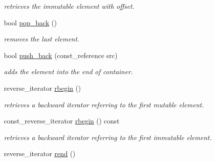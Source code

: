 \begin{DoxyCompactItemize}
\begin{DoxyCompactList}\small\item\em retrieves the immutable element with offset. \end{DoxyCompactList}\item 
\hypertarget{classhryky_1_1_fixed_vector_a67a4b8f465184732e190a2748876e3e8}{bool \hyperlink{classhryky_1_1_fixed_vector_a67a4b8f465184732e190a2748876e3e8}{pop\-\_\-back} ()}\label{classhryky_1_1_fixed_vector_a67a4b8f465184732e190a2748876e3e8}

\begin{DoxyCompactList}\small\item\em removes the last element. \end{DoxyCompactList}\item 
\hypertarget{classhryky_1_1_fixed_vector_abbe51e93d13aaed72485a62ee0163bc8}{bool \hyperlink{classhryky_1_1_fixed_vector_abbe51e93d13aaed72485a62ee0163bc8}{push\-\_\-back} (const\-\_\-reference src)}\label{classhryky_1_1_fixed_vector_abbe51e93d13aaed72485a62ee0163bc8}

\begin{DoxyCompactList}\small\item\em adds the element into the end of container. \end{DoxyCompactList}\item 
\hypertarget{classhryky_1_1_fixed_vector_a87885818e934930c46340007d4be8fff}{reverse\-\_\-iterator \hyperlink{classhryky_1_1_fixed_vector_a87885818e934930c46340007d4be8fff}{rbegin} ()}\label{classhryky_1_1_fixed_vector_a87885818e934930c46340007d4be8fff}

\begin{DoxyCompactList}\small\item\em retrieves a backward iterator referring to the first mutable element. \end{DoxyCompactList}\item 
\hypertarget{classhryky_1_1_fixed_vector_a03626d86b7c7a907ef8bc54042f9e2fb}{const\-\_\-reverse\-\_\-iterator \hyperlink{classhryky_1_1_fixed_vector_a03626d86b7c7a907ef8bc54042f9e2fb}{rbegin} () const }\label{classhryky_1_1_fixed_vector_a03626d86b7c7a907ef8bc54042f9e2fb}

\begin{DoxyCompactList}\small\item\em retrieves a backward iterator referring to the first immutable element. \end{DoxyCompactList}\item 
\hypertarget{classhryky_1_1_fixed_vector_ab032ea1f92c9b8dd29c1aeab6a4591ac}{reverse\-\_\-iterator \hyperlink{classhryky_1_1_fixed_vector_ab032ea1f92c9b8dd29c1aeab6a4591ac}{rend} ()}\label{classhryky_1_1_fixed_vector_ab032ea1f92c9b8dd29c1aeab6a4591ac}


\end{DoxyCompactItemize}
